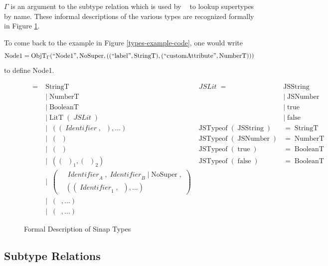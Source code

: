 \documentclass[12pt]{article}
\DeclareMathOperator{\StringT}{StringT}
\DeclareMathOperator{\NumberT}{NumberT}
\DeclareMathOperator{\BooleanT}{BooleanT}
\DeclareMathOperator{\LitT}{LitT}
\DeclareMathOperator{\JSLit}{\textit{JSLit}}
\DeclareMathOperator{\JSTypeof}{JSTypeof}
\DeclareMathOperator{\RecT}{RecT_\Gamma}
\DeclareMathOperator{\ObjT}{ObjT_\Gamma}
\DeclareMathOperator{\ListT}{ListT_\Gamma}
\DeclareMathOperator{\SetT}{SetT_\Gamma}
\DeclareMathOperator{\MapT}{MapT_\Gamma}
\DeclareMathOperator{\UnionT}{UnionT_\Gamma}
\DeclareMathOperator{\InterT}{InterT_\Gamma}
\DeclareMathOperator{\Identifier}{\textit{Identifier}}
\DeclareMathOperator{\Type}{{\textit{Type}_\Gamma}}
\DeclareMathOperator{\NoSuper}{NoSuper}
\DeclareMathOperator{\ObjectSubtype}{ObjectSubtype_\Gamma}
\begin{document}
\(\Gamma\) is an 
argument to the subtype relation which is used by \(\ObjectSubtype\) to 
lookup supertypes by name. These informal 
descriptions of the various types are recognized formally 
in Figure \ref{sinap-types-model}.

To come back to the example in Figure \ref{types-example-code}, 
one would write 
\[
    \operatorname{Node1} = \ObjT(``\text{Node1}", \NoSuper, (
        (``\text{label}", \StringT),
        (``\text{customAttribute}", \NumberT)
        ))
\]
to define Node1.

\linespread{1}
\begin{figure}
\begin{mdframed}
\begin{align*}
\Type = &\StringT   &\JSLit = &\operatorname{JSString} \\
&|\NumberT                 &&| \operatorname{JSNumber} \\
&|\BooleanT                &&| \operatorname{true} \\
&|\LitT(\JSLit)            &&| \operatorname{false} \\
&|\RecT((\Identifier, \Type), ...) & \JSTypeof(\operatorname{JSString}) &= \StringT \\
&|\ListT(\Type) & \JSTypeof(\operatorname{JSNumber}) &= \NumberT \\
&|\SetT(\Type) & \JSTypeof(\operatorname{true}) &= \BooleanT \\
&|\MapT((\Type)_1, (\Type)_2) & \JSTypeof(\operatorname{false}) &= \BooleanT \\
&|\ObjT\left(\begin{aligned}
    &\Identifier_A, \Identifier_B | \NoSuper, \\
&((\Identifier_1, \Type), ...)
\end{aligned}\right) \\
&|\InterT(\ObjT, ...) \\
&|\UnionT(\Type, ...)
\end{align*}
\end{mdframed}
\caption{Formal Description of Sinap Types}
\label{sinap-types-model}
\end{figure}

\subsection{Subtype Relations}
\end{document}
